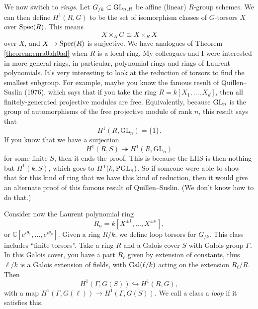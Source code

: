 \documentclass[reqno]{amsart} 
\numberwithin{theorem}{section}
\numberwithin{equation}{section}
\begin{document}
We now switch to \emph{rings}.  Let $G_{/k} \subset \operatorname{GL}_{n, R}$ be affine (linear) $R$-group schemes.  We can then define $H^1(R, G)$ to be the set of isomorphism classes of $G$-torsors $X$ over $\operatorname{Spec}(R)$.  This means
\begin{equation*}
  X \times_R G \cong X \times_R X
\end{equation*}
over $X$, and $X \rightarrow \operatorname{Spec}(R)$ is surjective.  We have analogues of Theorem \ref{theorem:cnra0ah0ad} when $R$ is a local ring.  My colleagues and I were interested in more general rings, in particular, polynomial rings and rings of Laurent polynomials.  It's very interesting to look at the reduction of torsors to find the smallest subgroup.  For example, maybe you know the famous result of Quillen--Suslin (1976), which says that if you take the ring $R = k[X_1, \dotsc, X_d]$, then all finitely-generated projective modules are free.  Equivalently, because $\operatorname{GL}_n$ is the group of automorphisms of the free projective module of rank $n$, this result says that
\begin{equation*}
  H^1(R, \mathrm{GL}_n) = \{1\}.
\end{equation*}
If you know that we have a surjection
\begin{equation*}
  H^1(R, S) \twoheadrightarrow
  H^1(R, \mathrm{GL}_n)
\end{equation*}
for some finite $S$, then it ends the proof.  This is because the LHS is then nothing but $H^1(k, S)$, which goes to $H^1(k, \operatorname{PGL}_n)$.  So if someone were able to show that for this kind of ring that we have this kind of reduction, then it would give an alternate proof of this famous result of Quillen--Suslin.  (We don't know how to do that.)

Consider now the Laurent polynomial ring
\begin{equation*}
  R_n = k[X^{\pm 1}, \dotsc, X^{\pm n}],
\end{equation*}
or $\mathbb{C}[e^{i \theta_1}, \dotsc, e^{i \theta_n}]$.  Given a ring $R /k$, we define loop torsors for $G_{/k}$.  This class includes ``finite torsors''.  Take a ring $R$ and a Galois cover $S$ with Galois group $\Gamma$.  In this Galois cover, you have a part $R_{\ell}$ given by extension of constants, thus $\ell / k$ is a Galois extension of fields, with $\operatorname{Gal}(\ell / k)$ acting on the extension $R_{\ell} / R$.  Then
\begin{equation*}
  H^1(\Gamma, G(S)) \hookrightarrow H^1(R, G),
\end{equation*}
with a map $H^1(\Gamma, G(\ell)) \rightarrow H^1(\Gamma, G(S))$.  We call a class a \emph{loop} if it satisfies this.
\end{document}
